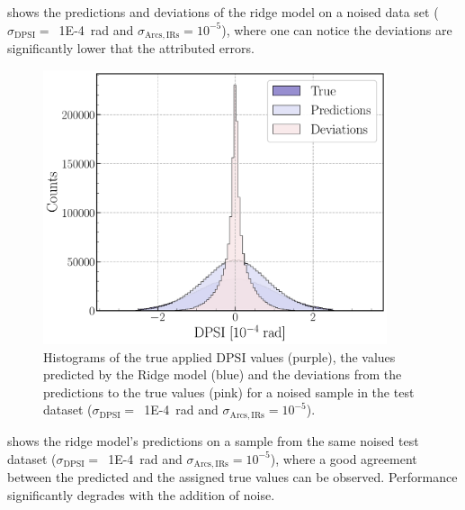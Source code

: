  shows the predictions and deviations of the ridge model on a noised data set (\(\sigma_{\mathrm{DPSI}} =\)~\qty{1E-4}{\radian} and \(\sigma_{\mathrm{Arcs, IRs}} = 10^{-5}\)), where one can notice the deviations are significantly lower that the attributed errors.

\begin{figure}[!htb]
    \centering
    \includegraphics*[width=0.9\textwidth]{Figures/ML_for_IR_Coupling/ridge_histograms.pdf}
    \caption{Histograms of the true applied \(\mathrm{DPSI}\) values (\textcolor{ridgepurple}{purple}), the values predicted by the Ridge model (\textcolor{ridgeblue}{blue}) and the deviations from the predictions to the true values (\textcolor{ridgesalmon}{pink}) for a noised sample in the test dataset (\(\sigma_{\mathrm{DPSI}} =\)~\qty{1E-4}{\radian} and \(\sigma_{\mathrm{Arcs, IRs}} = 10^{-5}\)).}
    \label{figure:ridge_histograms}
\end{figure}

 shows the ridge model's predictions on a sample from the same noised test dataset (\(\sigma_{\mathrm{DPSI}} =\)~\qty{1E-4}{\radian} and \(\sigma_{\mathrm{Arcs, IRs}} = 10^{-5}\)), where a good agreement between the predicted and the assigned true values can be observed.
Performance significantly degrades with the addition of noise.


